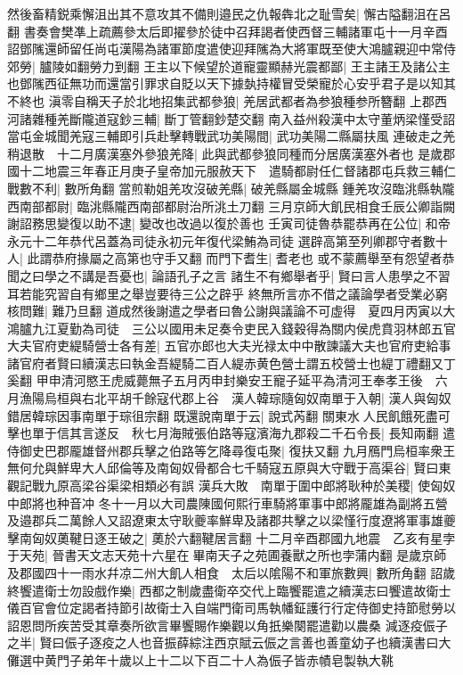 然後畜精鋭乘懈沮出其不意攻其不備則邉民之仇報犇北之耻雪矣|{
	懈古隘翻沮在呂翻}
書奏會樊凖上疏薦參太后即擢參於徒中召拜謁者使西督三輔諸軍屯十一月辛酉詔鄧隲還師留任尚屯漢陽為諸軍節度遣使迎拜隲為大將軍既至使大鴻臚親迎中常侍郊勞|{
	臚陵如翻勞力到翻}
王主以下候望於道寵靈顯赫光震都鄙|{
	王主諸王及諸公主也鄧隲西征無功而還當引罪求自貶以天下據埶持權冒受榮寵於心安乎君子是以知其不終也}
滇零自稱天子於北地招集武都參狼|{
	羌居武都者為参狼種参所簪翻}
上郡西河諸雜種羌斷隴道寇鈔三輔|{
	斷丁管翻鈔楚交翻}
南入益州殺漢中太守董炳梁慬受詔當屯金城聞羌寇三輔即引兵赴擊轉戰武功美陽間|{
	武功美陽二縣屬扶風}
連破走之羌稍退散　十二月廣漢塞外參狼羌降|{
	此與武都參狼同種而分居廣漢塞外者也}
是歲郡國十二地震三年春正月庚子皇帝加元服赦天下　遣騎都尉任仁督諸郡屯兵救三輔仁戰數不利|{
	數所角翻}
當煎勒姐羌攻沒破羌縣|{
	破羌縣屬金城縣}
鍾羌攻沒臨洮縣執隴西南部都尉|{
	臨洮縣隴西南部都尉治所洮土刀翻}
三月京師大飢民相食壬辰公卿詣闕謝詔務思變復以助不逮|{
	變改也改過以復於善也}
壬寅司徒魯恭罷恭再在公位|{
	和帝永元十二年恭代呂蓋為司徒永初元年復代梁鮪為司徒}
選辟高第至列卿郡守者數十人|{
	此謂恭府掾屬之高第也守手又翻}
而門下耆生|{
	耆老也}
或不蒙薦舉至有怨望者恭聞之曰學之不講是吾憂也|{
	論語孔子之言}
諸生不有鄉舉者乎|{
	賢曰言人患學之不習耳若能究習自有鄉里之舉豈要待三公之辟乎}
終無所言亦不借之議論學者受業必窮核問難|{
	難乃旦翻}
道成然後謝遣之學者曰魯公謝與議論不可虛得　夏四月丙寅以大鴻臚九江夏勤為司徒　三公以國用未足奏令吏民入錢穀得為關内侯虎賁羽林郎五官大夫官府吏緹騎營士各有差|{
	五官亦郎也大夫光禄太中中散諫議大夫也官府吏給事諸官府者賢曰續漢志曰執金吾緹騎二百人緹赤黄色營士謂五校營士也緹丁禮翻又丁奚翻}
甲申清河愍王虎威薨無子五月丙申封樂安王寵子延平為清河王奉孝王後　六月漁陽烏桓與右北平胡千餘寇代郡上谷　漢人韓琮隨匈奴南單于入朝|{
	漢人與匈奴錯居韓琮因事南單于琮徂宗翻}
既還說南單于云|{
	說式芮翻}
關東水人民飢餓死盡可擊也單于信其言遂反　秋七月海賊張伯路等寇濱海九郡殺二千石令長|{
	長知兩翻}
遣侍御史巴郡龎雄督州郡兵擊之伯路等乞降尋復屯聚|{
	復扶又翻}
九月鴈門烏桓率衆王無何允與鮮卑大人邱倫等及南匈奴骨都合七千騎寇五原與大守戰于高渠谷|{
	賢曰東觀記戰九原高梁谷渠梁相類必有誤}
漢兵大敗　南單于圍中郎將耿种於美稷|{
	使匈奴中郎將也种音冲}
冬十一月以大司農陳國何熙行車騎將軍事中郎將龎雄為副將五營及邉郡兵二萬餘人又詔遼東太守耿夔率鮮卑及諸郡共擊之以梁慬行度遼將軍事雄夔擊南匈奴薁鞬日逐王破之|{
	薁於六翻鞬居言翻}
十二月辛酉郡國九地震　乙亥有星孛于天苑|{
	晉書天文志天苑十六星在畢南天子之苑圃養獸之所也孛蒲内翻}
是歲京師及郡國四十一雨水幷凉二州大飢人相食　太后以隂陽不和軍旅數興|{
	數所角翻}
詔歲終饗遣衛士勿設戲作樂|{
	西都之制歲盡衛卒交代上臨饗罷遣之續漢志曰饗遣故衛士儀百官會位定謁者持節引故衛士入自端門衛司馬執幡鉦護行行定侍御史持節慰勞以詔恩問所疾苦受其章奏所欲言畢饗賜作樂觀以角扺樂闋罷遣勸以農桑}
減逐疫侲子之半|{
	賢曰侲子逐疫之人也音振薛綜注西京賦云侲之言善也善童幼子也續漢書曰大儺選中黄門子弟年十歲以上十二以下百二十人為侲子皆赤幘皂製執大鞉}


